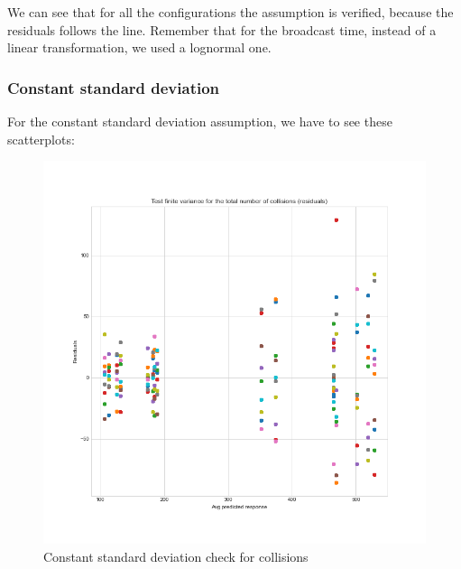 We can see that for all the configurations the assumption is verified, because
the residuals follows the line.  Remember that for the broadcast time, instead
of a linear transformation, we used a lognormal one.

\subsubsection{Constant standard deviation}

For the constant standard deviation assumption, we have to see these
scatterplots:

\begin{figure}
	\centering
	\includegraphics[width=\textwidth]
	{img/lowdensity2kr/assumptions/collisions-variance.png}
	\caption{Constant standard deviation check for
	collisions}\label{fig:system}
\end{figure}

